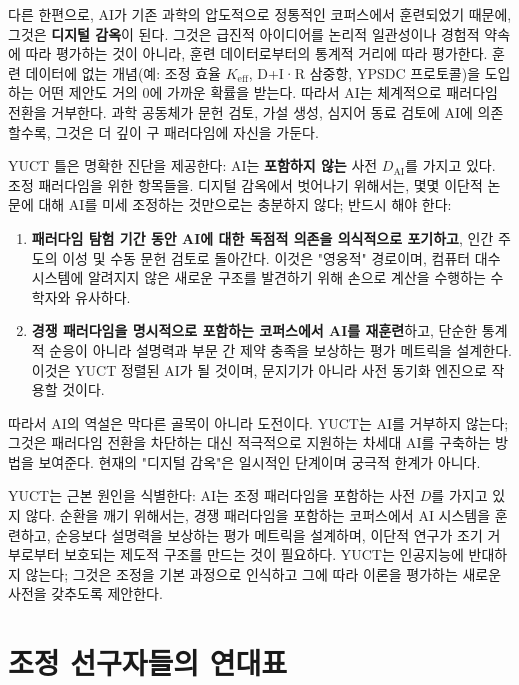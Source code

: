 \documentclass[12pt,a4paper]{article}
\begin{document}
	다른 한편으로, AI가 기존 과학의 압도적으로 정통적인 코퍼스에서 훈련되었기 때문에, 그것은 \textbf{디지털 감옥}이 된다. 그것은 급진적 아이디어를 논리적 일관성이나 경험적 약속에 따라 평가하는 것이 아니라, 훈련 데이터로부터의 통계적 거리에 따라 평가한다. 훈련 데이터에 없는 개념(예: 조정 효율 \(K_{\mathrm{eff}}\), D+I·R 삼중항, YPSDC 프로토콜)을 도입하는 어떤 제안도 거의 0에 가까운 확률을 받는다. 따라서 AI는 체계적으로 패러다임 전환을 거부한다. 과학 공동체가 문헌 검토, 가설 생성, 심지어 동료 검토에 AI에 의존할수록, 그것은 더 깊이 구 패러다임에 자신을 가둔다.
	
	YUCT 틀은 명확한 진단을 제공한다: AI는 \textbf{포함하지 않는} 사전 \(D_{\text{AI}}\)를 가지고 있다. 조정 패러다임을 위한 항목들을. 디지털 감옥에서 벗어나기 위해서는, 몇몇 이단적 논문에 대해 AI를 미세 조정하는 것만으로는 충분하지 않다; 반드시 해야 한다:
	
	\begin{enumerate}
		\item \textbf{패러다임 탐험 기간 동안 AI에 대한 독점적 의존을 의식적으로 포기하고}, 인간 주도의 이성 및 수동 문헌 검토로 돌아간다. 이것은 "영웅적" 경로이며, 컴퓨터 대수 시스템에 알려지지 않은 새로운 구조를 발견하기 위해 손으로 계산을 수행하는 수학자와 유사하다.
		\item \textbf{경쟁 패러다임을 명시적으로 포함하는 코퍼스에서 AI를 재훈련}하고, 단순한 통계적 순응이 아니라 설명력과 부문 간 제약 충족을 보상하는 평가 메트릭을 설계한다. 이것은 YUCT 정렬된 AI가 될 것이며, 문지기가 아니라 사전 동기화 엔진으로 작용할 것이다.
	\end{enumerate}
	
	따라서 AI의 역설은 막다른 골목이 아니라 도전이다. YUCT는 AI를 거부하지 않는다; 그것은 패러다임 전환을 차단하는 대신 적극적으로 지원하는 차세대 AI를 구축하는 방법을 보여준다. 현재의 "디지털 감옥"은 일시적인 단계이며 궁극적 한계가 아니다.
	
	YUCT는 근본 원인을 식별한다: AI는 조정 패러다임을 포함하는 사전 \(D\)를 가지고 있지 않다. 순환을 깨기 위해서는, 경쟁 패러다임을 포함하는 코퍼스에서 AI 시스템을 훈련하고, 순응보다 설명력을 보상하는 평가 메트릭을 설계하며, 이단적 연구가 조기 거부로부터 보호되는 제도적 구조를 만드는 것이 필요하다. YUCT는 인공지능에 반대하지 않는다; 그것은 조정을 기본 과정으로 인식하고 그에 따라 이론을 평가하는 새로운 사전을 갖추도록 제안한다.
	
	\section{조정 선구자들의 연대표}
	
\end{document}
